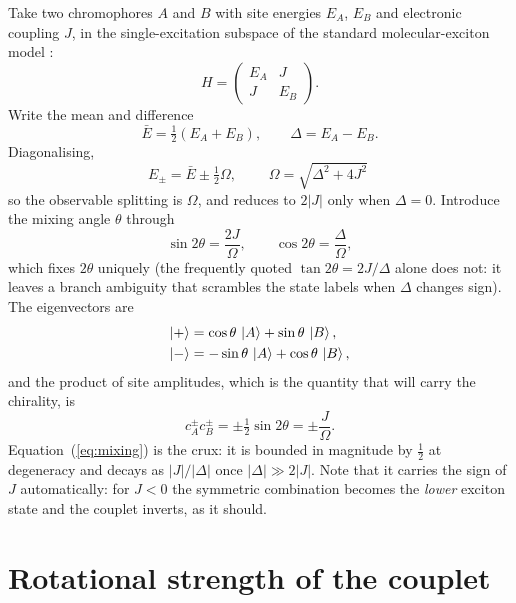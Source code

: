 \documentclass[11pt,a4paper]{article}
\begin{document}
Take two chromophores $A$ and $B$ with site energies $E_{A}$, $E_{B}$ and
electronic coupling $J$, in the single-excitation subspace of the standard
molecular-exciton model \cite{davydov1962,kasha1965}:
\begin{equation}
H=\begin{pmatrix} E_{A} & J \\ J & E_{B}\end{pmatrix} .
\end{equation}
Write the mean and difference
\begin{equation}
\bar{E}=\tfrac{1}{2}(E_{A}+E_{B}), \qquad \Delta = E_{A}-E_{B} .
\end{equation}
Diagonalising,
\begin{equation}
E_{\pm}=\bar{E}\pm\tfrac{1}{2}\Omega,
\qquad
\boxed{\;\Omega=\sqrt{\Delta^{2}+4J^{2}}\;}
\label{eq:omega}
\end{equation}
so the observable splitting is $\Omega$, and reduces to $2|J|$ only when
$\Delta=0$. Introduce the mixing angle $\theta$ through
\begin{equation}
\sin 2\theta = \frac{2J}{\Omega},
\qquad
\cos 2\theta = \frac{\Delta}{\Omega},
\label{eq:angle}
\end{equation}
which fixes $2\theta$ uniquely (the frequently quoted
$\tan 2\theta = 2J/\Delta$ alone does not: it leaves a branch ambiguity that
scrambles the state labels when $\Delta$ changes sign). The eigenvectors are
\begin{align}
\ket{+} &= \cos\theta\,\ket{A}+\sin\theta\,\ket{B}, \\
\ket{-} &= -\sin\theta\,\ket{A}+\cos\theta\,\ket{B},
\end{align}
and the product of site amplitudes, which is the quantity that will carry the
chirality, is
\begin{equation}
c^{\pm}_{A}c^{\pm}_{B}=\pm\tfrac{1}{2}\sin 2\theta
=\pm\frac{J}{\Omega}.
\label{eq:mixing}
\end{equation}
Equation~(\ref{eq:mixing}) is the crux: it is bounded in magnitude by
$\tfrac{1}{2}$ at degeneracy and decays as $|J|/|\Delta|$ once
$|\Delta|\gg 2|J|$. Note that it carries the sign of $J$ automatically: for
$J<0$ the symmetric combination becomes the \emph{lower} exciton state and the
couplet inverts, as it should.

\section{Rotational strength of the couplet}
\end{document}
